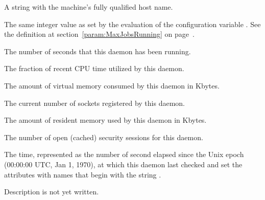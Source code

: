 \begin{description}
\item[\AdAttr{Machine}:] A string with the machine's fully qualified 
  host name.

\item[\AdAttr{MaxJobsRunning}:] The same integer value as set by the
  evaluation of the configuration variable .
  See the definition at section~\ref{param:MaxJobsRunning} on
  page~\pageref{param:MaxJobsRunning}.

\item[\AdAttr{MonitorSelfAge}:] The number of seconds that this daemon
  has been running.

\item[\AdAttr{MonitorSelfCPUUsage}:] The fraction of recent CPU time utilized
  by this daemon. 

\item[\AdAttr{MonitorSelfImageSize}:] The amount of virtual memory consumed by
  this daemon in Kbytes.

\item[\AdAttr{MonitorSelfRegisteredSocketCount}:] The current number of sockets
  registered by this daemon.

\item[\AdAttr{MonitorSelfResidentSetSize}:] The amount of resident memory
  used by this daemon in Kbytes.

\item[\AdAttr{MonitorSelfSecuritySessions}:] The number of open (cached)
  security sessions for this daemon.

\item[\AdAttr{MonitorSelfTime}:] The  time, represented as the number of
  second elapsed since the Unix epoch (00:00:00 UTC, Jan 1, 1970),
  at which this daemon last checked and set the attributes with names that
  begin with the string .
  
\item[\AdAttr{MyAddress}:] Description is not yet written.


\end{description}
